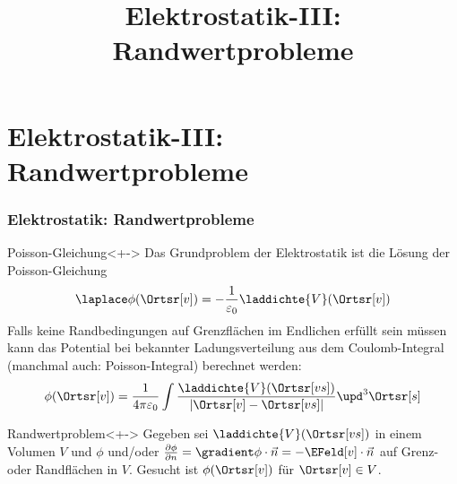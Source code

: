 

\title[TET: Elektrostatik-III: Randwertprobleme]{Elektrostatik-III: Randwertprobleme}


% 
% 

\maketitle

% 
% 
\section{Elektrostatik-III: Randwertprobleme}

\begin{frame}

  \frametitle{Elektrostatik: Randwertprobleme}

  \begin{block}{Poisson-Gleichung}<+->
    Das Grundproblem der Elektrostatik ist die Lösung der
    \alert{Poisson-Gleichung}
    $$
    \laplace \phi(\Ortsr[v]) = -\frac{1}{\varepsilon_0}
    \laddichte{V} (\Ortsr[v])
    $$
    Falls \alert{keine Randbedingungen auf Grenzflächen im Endlichen}
    erfüllt sein müssen kann das Potential bei bekannter
    Ladungsverteilung aus dem \alert{Coulomb-Integral} (manchmal auch:
    \alert{Poisson-Integral}) berechnet werden:
    $$
   \phi(\Ortsr[v]) = \frac{1}{4\pi\varepsilon_0} \int
   \frac{\laddichte{V}(\Ortsr[vs])}{|\Ortsr[v]-\Ortsr[vs]|}
   \upd^3\Ortsr[s]
   $$
 \end{block}

 \begin{block}{Randwertproblem}<+->
   \alert{Gegeben} sei $\laddichte{V}(\Ortsr[vs])$ in einem Volumen $V$ und \alert{$\phi$} und/oder \alert{$\frac{\partial\phi}{\partial n}=\gradient\phi\cdot\vec{n}=-\EFeld[v] \cdot \vec{n}$} auf Grenz- oder Randflächen in $V$. \alert{Gesucht} ist $\phi(\Ortsr[v])$ für $\Ortsr[v] \in V$.   
   \end{block}
  
 \end{frame}

